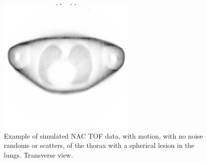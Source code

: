                 \begin{figure}
                    \centering
                    
                    \includegraphics[width=1.0\linewidth]{figures/background_nAC_example.png}
                    
                    \captionsetup{singlelinecheck=false, justification=raggedright}
                    \caption{Example of simulated \gls{NAC} \gls{TOF} data, with motion, with no noise randoms or scatters, of the thorax with a spherical lesion in the lungs. Transverse view.} \label{fig:combined_pet_ct_nAC_tof_example}
                \end{figure}
                
